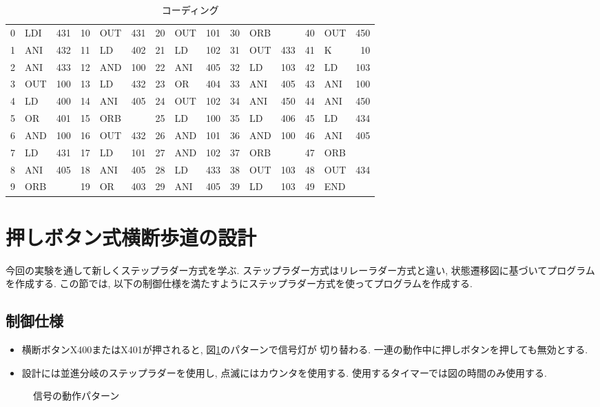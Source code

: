 \documentclass[titlepage]{jsarticle}
\begin{document}
    \begin{table}[h]
      \caption{コーディング}
      \label{tab:quiz_code}
      \centering
      \begin{tabular}{r|lr||r|lr||r|lr||r|lr||r|lr}
        0 & LDI & 431 & 10 & OUT & 431 & 20 & OUT & 101 & 30 & ORB & &     40 & OUT & 450 \\
        1 & ANI & 432 & 11 & LD &  402 & 21 & LD &  102 & 31 & OUT & 433 & 41 & K &   10 \\
        2 & ANI & 433 & 12 & AND & 100 & 22 & ANI & 405 & 32 & LD &  103 & 42 & LD &  103 \\
        3 & OUT & 100 & 13 & LD &  432 & 23 & OR &  404 & 33 & ANI & 405 & 43 & ANI & 100 \\
        4 & LD &  400 & 14 & ANI & 405 & 24 & OUT & 102 & 34 & ANI & 450 & 44 & ANI & 450 \\
        5 & OR &  401 & 15 & ORB & &     25 & LD &  100 & 35 & LD &  406 & 45 & LD &  434 \\
        6 & AND & 100 & 16 & OUT & 432 & 26 & AND & 101 & 36 & AND & 100 & 46 & ANI & 405 \\
        7 & LD &  431 & 17 & LD &  101 & 27 & AND & 102 & 37 & ORB & &     47 & ORB & \\
        8 & ANI & 405 & 18 & ANI & 405 & 28 & LD &  433 & 38 & OUT & 103 & 48 & OUT & 434 \\
        9 & ORB & &     19 & OR &  403 & 29 & ANI & 405 & 39 & LD &  103 & 49 & END & \\
      \end{tabular}
    \end{table}
\section{押しボタン式横断歩道の設計}
  今回の実験を通して新しくステップラダー方式を学ぶ.
  ステップラダー方式はリレーラダー方式と違い,
  状態遷移図に基づいてプログラムを作成する.
  この節では, 以下の制御仕様を満たすようにステップラダー方式を使ってプログラムを作成する.
  \subsection{制御仕様}
    \begin{itemize}
      \item 横断ボタンX400またはX401が押されると, 図\ref{fig:sig_pat}のパターンで信号灯が
        切り替わる. 一連の動作中に押しボタンを押しても無効とする.
      \item 設計には並進分岐のステップラダーを使用し, 点滅にはカウンタを使用する.
        使用するタイマーでは図の時間のみ使用する.
    \end{itemize}
    \begin{figure}[h]
      \centering
      \caption{信号の動作パターン}
      \label{fig:sig_pat}
    \end{figure}
\end{document}
